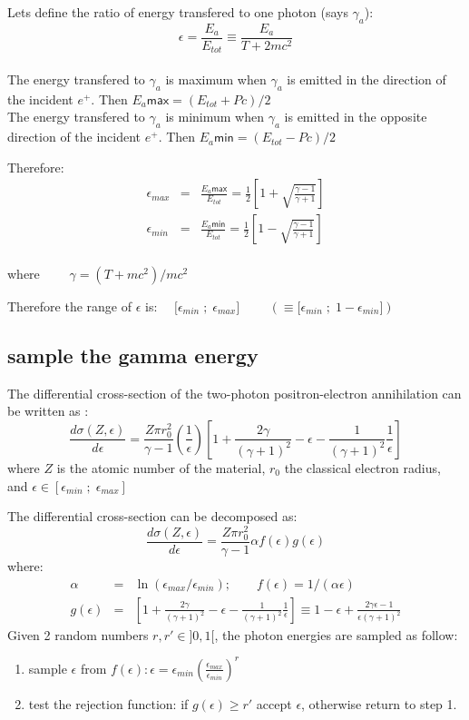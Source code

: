 \noindent
Lets define the ratio of energy transfered to one photon (says $\gamma_a$):
\[ \epsilon = \frac{E_a}{E_{tot}} \equiv \frac{E_a}{T+2mc^2} \]
\\
The energy transfered to $\gamma_a$ is maximum when $\gamma_a$ is emitted in the
direction of the incident $e^+$. Then $E_a \mathsf{max} = (E_{tot}+Pc)/2$
\\
The energy transfered to $\gamma_a$ is minimum when $\gamma_a$ is emitted in the opposite
direction of the incident $e^+$. Then $E_a \mathsf{min} = (E_{tot}-Pc)/2$

\noindent Therefore:
\begin {eqnarray*}
  \epsilon_{max} &=& \frac{E_a \mathsf{max}}{E_{tot}} =
  \frac{1}{2} \left\lbrack 1+ \sqrt{\frac{\gamma - 1}{\gamma+1}} \right\rbrack \\ 
  \epsilon_{min} &=& \frac{E_a \mathsf{min}}{E_{tot}} =
  \frac{1}{2} \left\lbrack 1- \sqrt{\frac{\gamma - 1}{\gamma+1}} 
  \right\rbrack
\end {eqnarray*}
\\
where $\qquad \gamma = (T + mc^2)/mc^2$


\noindent  
Therefore the range of $\epsilon$ is: 
 $\quad \lbrack \epsilon_{min} \; ; \; \epsilon_{max} \rbrack $
 $\qquad ( \equiv \lbrack \epsilon_{min} \; ; \; 1-\epsilon_{min} \rbrack) $
      
\subsection{sample the gamma energy}
The differential cross-section of the two-photon
positron-electron annihilation can be written as 
\cite{heitler,egs4}:
\[
   \frac{d \sigma (Z, \epsilon)} {d \epsilon} =
   \frac{Z \pi r_0^2}{\gamma - 1} \left( \frac{1}{\epsilon} \right)
   \left[
   1+\frac{2\gamma}{(\gamma+1)^2}-\epsilon-\frac{1}{(\gamma+1)^2}\frac{1}{\epsilon}
   \right]
\]
where
$Z$ is the atomic number of the material, $r_{0}$ the classical electron 
radius, and $\epsilon \in [ \epsilon_{min} \; ; \; \epsilon_{max} ]$

\noindent
The differential
cross-section can be decomposed as:
\[
   \frac{d \sigma (Z, \epsilon)} {d \epsilon} =
   \frac{Z \pi r_0^2}{\gamma - 1} 
   \alpha f(\epsilon) g(\epsilon)
\]
where: 
\begin{eqnarray*}
\alpha      &=& \ln (\epsilon_{max}/\epsilon_{min}); \qquad  
f(\epsilon)  = 1/(\alpha \epsilon) \\
g(\epsilon) &=& \left[
    1+\frac{2\gamma}{(\gamma+1)^2}-\epsilon-\frac{1}{(\gamma+1)^2}\frac{1}{\epsilon}
    \right]  \equiv  
    1-\epsilon+\frac{2 \gamma \epsilon -1}{\epsilon (\gamma +1)^2}
\end{eqnarray*}
Given 2 random numbers $r, r' \in ]0,1[$, 
the photon energies are sampled as follow:
\begin{enumerate}
\item 
  sample $\epsilon$ from $f(\epsilon):
  \epsilon =\epsilon_{min} \left( \frac{\epsilon_{max}}{\epsilon_{min}} \right)^r$
\item
  test the rejection function: if $g(\epsilon) \geq r'$ accept
  $\epsilon$, otherwise return to step 1.
\end{enumerate}

